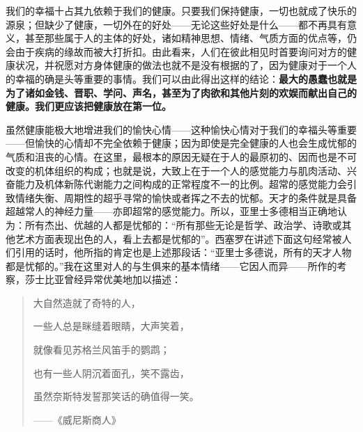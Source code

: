 \documentclass[12pt,oneside]{book}
\begin{document}
我们的幸福十占其九依赖于我们的健康。只要我们保持健康，一切也就成了快乐的源泉；但缺少了健康，一切外在的好处——无论这些好处是什么——都不再具有意义，甚至那些属于人的主体的好处，诸如精神思想、情绪、气质方面的优点等，仍会由于疾病的缘故而被大打折扣。由此看来，人们在彼此相见时首要询问对方的健康状况，并祝愿对方身体健康的做法也就不是没有根据的了，因为健康对于一个人的幸福的确是头等重要的事情。我们可以由此得出这样的结论：\textbf{最大的愚蠢也就是为了诸如金钱、晋职、学问、声名，甚至为了肉欲和其他片刻的欢娱而献出自己的健康。我们更应该把健康放在第一位。}

虽然健康能极大地增进我们的愉快心情——这种愉快心情对于我们的幸福头等重要——但愉快的心情却不完全依赖于健康；因为即使是完全健康的人也会生成忧郁的气质和沮丧的心情。在这里，最根本的原因无疑在于人的最原初的、因而也是不可改变的机体组织的构成；也就是说，大致上在于一个人的感觉能力与肌肉活动、兴奋能力及机体新陈代谢能力之间构成的正常程度不一的比例。超常的感觉能力会引致情绪失衡、周期性的超乎寻常的愉快或者挥之不去的忧郁。天才的条件就是具备超越常人的神经力量——亦即超常的感觉能力。所以，亚里士多德相当正确地认为：所有杰出、优越的人都是忧郁的：“所有那些无论是哲学、政治学、诗歌或其他艺术方面表现出色的人，看上去都是忧郁的”。西塞罗在讲述下面这句经常被人们引用的话时，他所指的肯定也是上述那段话：“亚里士多德说，所有的天才人物都是忧郁的。”我在这里对人的与生俱来的基本情绪——它因人而异——所作的考察，莎士比亚曾经异常优美地加以描述： 

 
\begin{quotation}
大自然造就了奇特的人，

一些人总是眯缝着眼睛，大声笑着， 

就像看见苏格兰风笛手的鹦鹉； 

也有一些人阴沉着面孔，笑不露齿， 

虽然奈斯特发誓那笑话的确值得一笑。 

——《威尼斯商人》 
\end{quotation}
\end{document}
